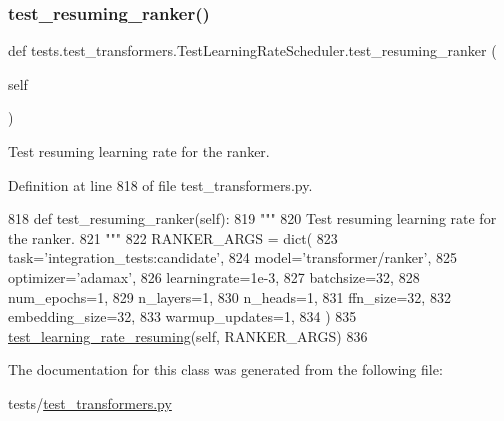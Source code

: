 \subsubsection{\texorpdfstring{test\+\_\+resuming\+\_\+ranker()}{test\_resuming\_ranker()}}
{\footnotesize\ttfamily def tests.\+test\+\_\+transformers.\+Test\+Learning\+Rate\+Scheduler.\+test\+\_\+resuming\+\_\+ranker (\begin{DoxyParamCaption}\item[{}]{self }\end{DoxyParamCaption})}

\begin{DoxyVerb}Test resuming learning rate for the ranker.
\end{DoxyVerb}
 

Definition at line 818 of file test\+\_\+transformers.\+py.


\begin{DoxyCode}
818     \textcolor{keyword}{def }test\_resuming\_ranker(self):
819         \textcolor{stringliteral}{"""}
820 \textcolor{stringliteral}{        Test resuming learning rate for the ranker.}
821 \textcolor{stringliteral}{        """}
822         RANKER\_ARGS = dict(
823             task=\textcolor{stringliteral}{'integration\_tests:candidate'},
824             model=\textcolor{stringliteral}{'transformer/ranker'},
825             optimizer=\textcolor{stringliteral}{'adamax'},
826             learningrate=1e-3,
827             batchsize=32,
828             num\_epochs=1,
829             n\_layers=1,
830             n\_heads=1,
831             ffn\_size=32,
832             embedding\_size=32,
833             warmup\_updates=1,
834         )
835         \hyperlink{namespacetests_1_1test__transformers_a8d6cf0022229f5deba37f23f30601117}{test\_learning\_rate\_resuming}(self, RANKER\_ARGS)
836 
\end{DoxyCode}


The documentation for this class was generated from the following file\+:\begin{DoxyCompactItemize}
\item 
tests/\hyperlink{test__transformers_8py}{test\+\_\+transformers.\+py}\end{DoxyCompactItemize}
